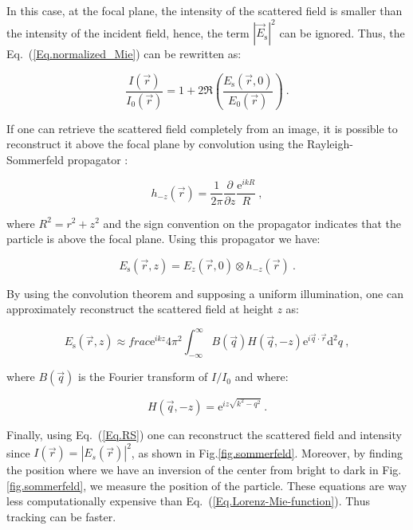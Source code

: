 In this case, at the focal plane, the intensity of the scattered field is smaller than the intensity of the incident field, hence, the term $|\vec{E}_\mathrm{s}|^2$ can be ignored. Thus, the Eq.~(\ref{Eq.normalized_Mie}) can be rewritten as:

\begin{equation}
	\frac{I(\vec{r})}{I_0(\vec{r})}= 1 + 2\Re \left( \frac{E_\mathrm{s}(\vec{r},0)}{E_0(\vec{r})} \right) ~.
\end{equation}

If one can retrieve the scattered field completely from an image, it is possible to reconstruct it above the focal plane by convolution using the Rayleigh-Sommerfeld propagator \cite{goodman_introduction_2005}:

\begin{equation}
	h_{-z}(\vec{r}) = \frac{1}{2 \pi} \frac{\partial}{\partial z} \frac{\mathrm{e}^{ikR}}{R} ~,
\end{equation}

where $ R^2 = r^2 + z^2 $ and the sign convention on the propagator indicates that the particle is above the focal plane. Using this propagator we have:

\begin{equation}
	E_\mathrm{s}(\vec{r}, z) = E_z(\vec{r}, 0) \otimes h_{-z}(\vec{r}) ~.
	\label{Eq:propagator}
\end{equation}

By using the convolution theorem \cite{cheong_strategies_2010, goodman_introduction_2005, sherman_application_1967,schnars_digital_1994} and supposing a uniform illumination, one can approximately reconstruct the scattered field at height $z$ as:

\begin{equation}
	E_\mathrm{s}(\vec{r}, z) \approx frac{\mathrm{e}^{ikz}}{4\pi ^2}
	\int ^\infty _{- \infty}
	B(\vec{q}) H(\vec{q}, -z) \mathrm{e}^{i \vec{q} \cdot \vec{r}} \mathrm{d}^2 q
	\label{Eq.RS} ~,
\end{equation}

where $B(\vec{q})$ is the Fourier transform of $I/I_0$ and where:

\begin{equation}
	H(\vec{q}, -z) = \mathrm{e}^{iz \sqrt{k^2 - q^2}} ~.
\end{equation}

Finally, using Eq.~(\ref{Eq.RS}) one can reconstruct the scattered field and intensity since $I(\vec{r}) = |E_s(\vec{r})|^2$, as shown in Fig.\ref{fig.sommerfeld}. Moreover, by finding the position where we have an inversion of the center from bright to dark in Fig.\ref{fig.sommerfeld}, we measure the position of the particle.
These equations are way less computationally expensive than Eq.~(\ref{Eq.Lorenz-Mie-function}). Thus tracking can be faster.

